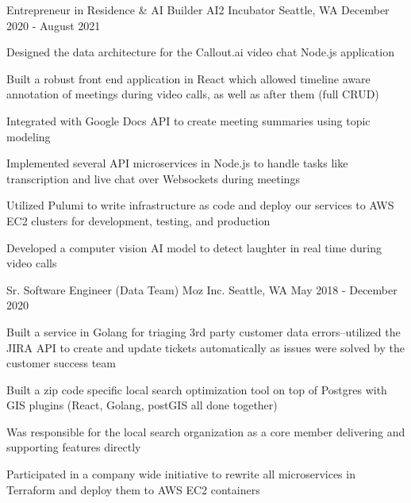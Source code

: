 \begin{cventries}
  \cventry
    {Entrepreneur in Residence \& AI Builder} %
    {AI2 Incubator} %
    {Seattle, WA} %
    {December 2020 - August 2021} %
    {
      \begin{cvitems} %
        \item {Designed the data architecture for the Callout.ai video chat Node.js application}
        \item {Built a robust front end application in React which allowed timeline aware annotation of meetings during video calls, as well as after them (full CRUD)}
        \item {Integrated with Google Docs API to create meeting summaries using topic modeling}
        \item {Implemented several API microservices in Node.js to handle tasks like transcription and live chat over Websockets during meetings}
        \item {Utilized Pulumi to write infrastructure as code and deploy our services to AWS EC2 clusters for development, testing, and production}
        \item {Developed a computer vision AI model to detect laughter in real time during video calls}
      \end{cvitems}
    }

  \cventry
    {Sr. Software Engineer (Data Team)} %
    {Moz Inc.} %
    {Seattle, WA} %
    {May 2018 - December 2020} %
    {
      \begin{cvitems} %
        \item {Built a service in Golang for triaging 3rd party customer data errors--utilized the JIRA API to create and update tickets automatically as issues were solved by the customer success team}
        \item {Built a zip code specific local search optimization tool on top of Postgres with GIS plugins (React, Golang, postGIS all done together)}
        \item {Was responsible for the local search organization as a core member delivering and supporting features directly}
        \item {Participated in a company wide initiative to rewrite all microservices in Terraform and deploy them to AWS EC2 containers}
      \end{cvitems}
    }


\end{cventries}
